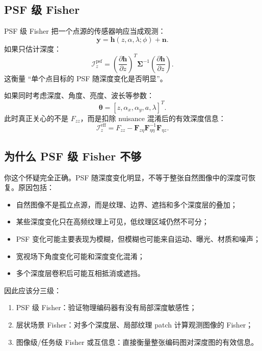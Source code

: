 \documentclass[11pt,a4paper,fontset=none]{ctexart}
\begin{document}
\subsection{PSF 级 Fisher}

PSF 级 Fisher 把一个点源的传感器响应当成观测：
\begin{equation}
  \bm y=\bm h(z,\alpha,\lambda;\phi)+\bm n.
\end{equation}
如果只估计深度：
\begin{equation}
  \mathcal I_z^{\mathrm{psf}}
  =
  \left(
  \frac{\partial \bm h}{\partial z}
  \right)^T
  \bm\Sigma^{-1}
  \left(
  \frac{\partial \bm h}{\partial z}
  \right).
\end{equation}
这衡量 ``单个点目标的 PSF 随深度变化是否明显''。

如果同时考虑深度、角度、亮度、波长等参数：
\begin{equation}
  \bm\theta=[z,\alpha_x,\alpha_y,a,\lambda]^T.
\end{equation}
此时真正关心的不是 $F_{zz}$，而是扣除 nuisance 混淆后的有效深度信息：
\begin{equation}
  \mathcal I_z^{\mathrm{eff}}
  =
  F_{zz}-\bm F_{z\eta}\bm F_{\eta\eta}^{-1}\bm F_{\eta z}.
\end{equation}

\subsection{为什么 PSF 级 Fisher 不够}

你这个怀疑完全正确。PSF 随深度变化明显，不等于整张自然图像中的深度可恢复。原因包括：
\begin{itemize}
  \item 自然图像不是孤立点源，而是纹理、边界、遮挡和多个深度层的叠加；
  \item 某些深度变化只在高频纹理上可见，低纹理区域仍然不可分；
  \item PSF 变化可能主要表现为模糊，但模糊也可能来自运动、曝光、材质和噪声；
  \item 宽视场下角度变化可能和深度变化混淆；
  \item 多个深度层卷积后可能互相抵消或遮挡。
\end{itemize}

因此应该分三级：
\begin{enumerate}
  \item PSF 级 Fisher：验证物理编码器有没有局部深度敏感性；
  \item 层状场景 Fisher：对多个深度层、局部纹理 patch 计算观测图像的 Fisher；
  \item 图像级/任务级 Fisher 或互信息：直接衡量整张编码图对深度图的有效信息。
\end{enumerate}
\end{document}

